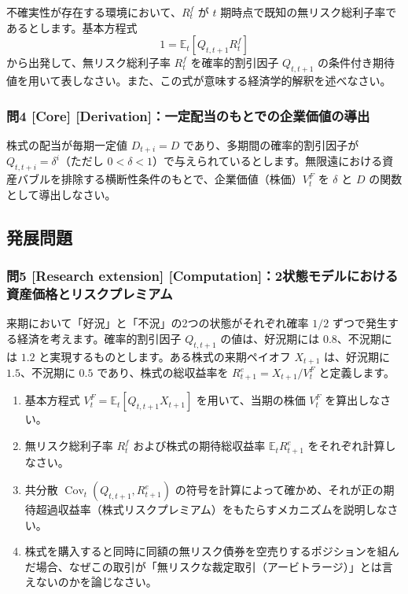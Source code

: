 \documentclass[
  japanese,
  lualatex,
  ja=standard,
  12pt,
  a4paper]{ltjsarticle}
\providecommand{\tightlist}{%
  \setlength{\itemsep}{0pt}\setlength{\parskip}{0pt}}
\begin{document}
不確実性が存在する環境において、\(R_t^f\) が \(t\)
期時点で既知の無リスク総利子率であるとします。基本方程式 \[
1 = \mathbb{E}_t \left[ Q_{t,t+1} R_t^f \right]
\] から出発して、無リスク総利子率 \(R_t^f\) を確率的割引因子
\(Q_{t,t+1}\)
の条件付き期待値を用いて表しなさい。また、この式が意味する経済学的解釈を述べなさい。

\subsubsection{問4 {[}Core{]}
{[}Derivation{]}：一定配当のもとでの企業価値の導出}\label{ux554f4-core-derivationux4e00ux5b9aux914dux5f53ux306eux3082ux3068ux3067ux306eux4f01ux696dux4fa1ux5024ux306eux5c0eux51fa}

株式の配当が毎期一定値 \(D_{t+i} = D\) であり、多期間の確率的割引因子が
\(Q_{t,t+i} = \delta^i\)（ただし
\(0 < \delta < 1\)）で与えられているとします。無限遠における資産バブルを排除する横断性条件のもとで、企業価値（株価）\(V_t^F\)
を \(\delta\) と \(D\) の関数として導出しなさい。

\subsection{発展問題}\label{ux767aux5c55ux554fux984c}

\subsubsection{問5 {[}Research extension{]}
{[}Computation{]}：2状態モデルにおける資産価格とリスクプレミアム}\label{ux554f5-research-extension-computation2ux72b6ux614bux30e2ux30c7ux30ebux306bux304aux3051ux308bux8cc7ux7523ux4fa1ux683cux3068ux30eaux30b9ux30afux30d7ux30ecux30dfux30a2ux30e0}

来期において「好況」と「不況」の2つの状態がそれぞれ確率 \(1/2\)
ずつで発生する経済を考えます。確率的割引因子 \(Q_{t,t+1}\)
の値は、好況期には \(0.8\)、不況期には \(1.2\)
と実現するものとします。ある株式の来期ペイオフ \(X_{t+1}\) は、好況期に
\(1.5\)、不況期に \(0.5\) であり、株式の総収益率を
\(R_{t+1}^e = X_{t+1}/V_t^F\) と定義します。

\begin{enumerate}
\def\labelenumi{\arabic{enumi}.}
\tightlist
\item
  基本方程式 \(V_t^F = \mathbb{E}_t[Q_{t,t+1} X_{t+1}]\)
  を用いて、当期の株価 \(V_t^F\) を算出しなさい。
\item
  無リスク総利子率 \(R_t^f\) および株式の期待総収益率
  \(\mathbb{E}_t R_{t+1}^e\) をそれぞれ計算しなさい。
\item
  共分散 \(\operatorname{Cov}_t(Q_{t,t+1}, R_{t+1}^e)\)
  の符号を計算によって確かめ、それが正の期待超過収益率（株式リスクプレミアム）をもたらすメカニズムを説明しなさい。
\item
  株式を購入すると同時に同額の無リスク債券を空売りするポジションを組んだ場合、なぜこの取引が「無リスクな裁定取引（アービトラージ）」とは言えないのかを論じなさい。
\end{enumerate}
\end{document}
